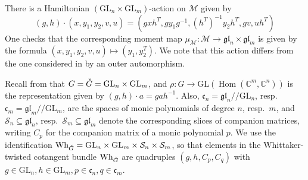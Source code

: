 \documentclass[11pt]{article}
\theoremstyle{definition}
\theoremstyle{plain}
\theoremstyle{remark}
\newcommand{\GL}{\mathrm{GL}}
\newcommand{\numberset}{\mathbb}
\newcommand{\C}{\numberset{C}}
\newcommand{\git}{/\!\!/}
\newcommand{\gl}{\mathfrak{gl}}
\DeclareMathOperator{\Hom}{Hom}
\begin{document}
        There is a Hamiltonian $(\GL_n \times \GL_m)$-action on $\mathcal{M}$ given by 
        \begin{equation}\label{eq-actionontriangles}
            (g,h) \cdot (x,y_1,y_2,v,u) = (gxh^T,gy_1g^{-1},(h^{T})^{-1}y_2h^T,gv,uh^{T})
        \end{equation}
        One checks that the corresponding moment map $\mu_{\mathcal{M}}\colon \mathcal{M} \to \gl_n \times \gl_m$ is given by the formula $(x,y_1,y_2,v,u) \mapsto (y_1,y_2^T)$. We note that this action differs from the one considered in \cite{NakajimaTakayama2017} by an outer automorphism.
    
        Recall from  that $G = \Check{G} = \GL_n \times \GL_m$, and $\rho\colon G \to \GL(\Hom(\C^m,\C^n))$ is the representation given by $(g,h) \cdot a = gah^{-1}$. Also, $\mathfrak{c}_n = \gl_n \git \GL_n$, resp.\ $\mathfrak{c}_m = \gl_m \git \GL_m$, are the spaces of monic polynomials of degree $n$, resp.\ $m$, and $\mathcal{S}_n \subseteq \gl_n$, resp.\ $\mathcal{S}_m \subseteq \gl_m$ denote the corresponding slices of companion matrices, writing $C_p$ for the companion matrix of a monic polynomial $p$. We use the identification $\mathrm{Wh}_{\Check{G}} = \GL_n \times \GL_m \times \mathcal{S}_n \times \mathcal{S}_m$, so that elements in the Whittaker-twisted cotangent bundle $\mathrm{Wh}_{\Check{G}}$ are quadruples $(g,h,C_p,C_q)$ with $g \in \GL_n, h \in \GL_m, p \in \mathfrak{c}_n, q \in \mathfrak{c}_m$. %
        
\end{document}
